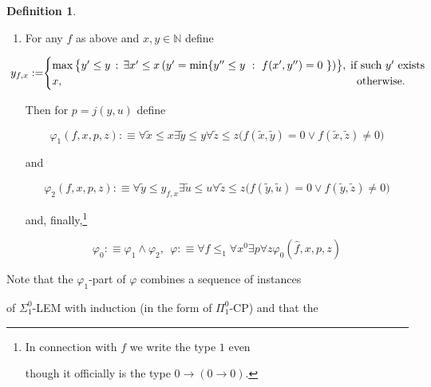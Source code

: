 \documentclass[1p]{elsarticle}
\newcommand{\NN}{\ensuremath{\mathbb{N}}}
\newcommand{\Telse}{\text{otherwise}}
\theoremstyle{plain}
\theoremstyle{definition}
\newtheorem{dfn}[thm]{Definition}
\theoremstyle{remark}
\renewcommand{\phi}{\varphi}
\theoremstyle{definition}
\begin{document}
{\begin{dfn}
\begin{enumerate}
one but also that it has at most one root.

\item 

For any $f$ as above and $x,y\in\NN$ define

\[ \hspace*{-5mm}

y_{f,x}:=\hspace*{-1mm}\begin{cases}

\max\big\{y'\leq y\, :\, \exists x'\le x\,

(y'=\min\{y''\leq y\ :\ f(x',y'')=0

\ \})\big\},& \hspace*{-2mm} \text{if such $y'$ exists}\\

x,&\Telse.

\end{cases}

\]

Then for $p=j(y,u)$ define 

\[ \varphi_1(f,x,p,z): \equiv

\forall \tilde x \leq x \exists \tilde y\leq y \forall \tilde z\leq z 

\big(f(\tilde x,\tilde y)=0\vee f(\tilde x,\tilde z)\neq0\big) \] 

and 

\[ \varphi_2(f,x,p,z):\equiv 

\forall \tilde y \leq y_{f,x} \exists \tilde u\leq u \forall \tilde z\leq z 

\big(f(\tilde y,\tilde u)=0\vee f(\tilde y,\tilde z)\neq0\big) \] 

and, finally,\footnote{In connection with $f$ we write the type $1$ even 

though it officially is the type $0\to (0\to 0).$} 

\[ \varphi_0:\equiv \varphi_1\wedge\varphi_2, \ \ \varphi:\equiv

\forall f\leq_1  \forall x^0 \exists p  \forall z \phi_0 

(\widehat{f},x,p,z)

\]

\end{enumerate}

\end{dfn}

Note that the $\varphi_1$-part of $\varphi$ combines a sequence of instances 

of $\Sigma^0_1$-LEM with induction (in the form of $\Pi^0_1$-CP) and that the 

}
\end{document}

